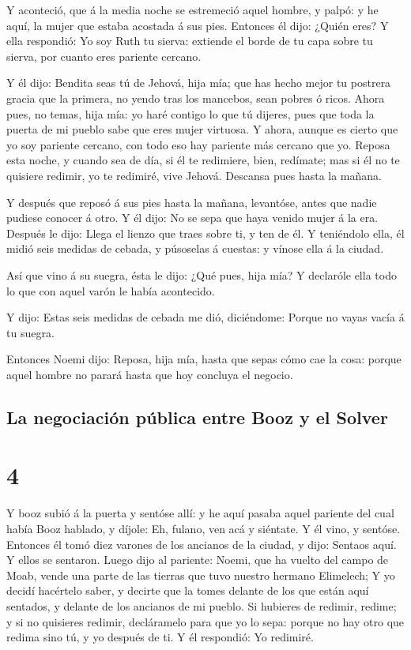  Y aconteció, que á la media noche se estremeció aquel
hombre, y palpó: y he aquí, la mujer que estaba acostada á sus pies.
 Entonces él dijo: ¿Quién eres? Y ella respondió: Yo soy
Ruth tu sierva: extiende el borde de tu capa sobre tu sierva, por cuanto
eres pariente cercano.

 Y él dijo: Bendita seas tú de Jehová, hija mía; que has
hecho mejor tu postrera gracia que la primera, no yendo tras los
mancebos, sean pobres ó ricos.  Ahora pues, no temas, hija
mía: yo haré contigo lo que tú dijeres, pues que toda la puerta de mi
pueblo sabe que eres mujer virtuosa.  Y ahora, aunque es
cierto que yo soy pariente cercano, con todo eso hay pariente más
cercano que yo.  Reposa esta noche, y cuando sea de día, si
él te redimiere, bien, redímate; mas si él no te quisiere redimir, yo te
redimiré, vive Jehová. Descansa pues hasta la mañana.

 Y después que reposó á sus pies hasta la mañana,
levantóse, antes que nadie pudiese conocer á otro. Y él dijo: No se sepa
que haya venido mujer á la era.  Después le dijo: Llega el
lienzo que traes sobre ti, y ten de él. Y teniéndolo ella, él midió seis
medidas de cebada, y púsoselas á cuestas: y vínose ella á la ciudad.

 Así que vino á su suegra, ésta le dijo: ¿Qué pues, hija
mía? Y declaróle ella todo lo que con aquel varón le había acontecido.

 Y dijo: Estas seis medidas de cebada me dió, diciéndome:
Porque no vayas vacía á tu suegra.

 Entonces Noemi dijo: Reposa, hija mía, hasta que sepas
cómo cae la cosa: porque aquel hombre no parará hasta que hoy concluya
el negocio.

\hypertarget{la-negociaciuxf3n-puxfablica-entre-booz-y-el-solver}{%
\subsection{La negociación pública entre Booz y el
Solver}\label{la-negociaciuxf3n-puxfablica-entre-booz-y-el-solver}}

\hypertarget{section-3}{%
\section{4}\label{section-3}}

 Y booz subió á la puerta y sentóse allí: y he aquí pasaba
aquel pariente del cual había Booz hablado, y díjole: Eh, fulano, ven
acá y siéntate. Y él vino, y sentóse.  Entonces él tomó diez
varones de los ancianos de la ciudad, y dijo: Sentaos aquí. Y ellos se
sentaron.  Luego dijo al pariente: Noemi, que ha vuelto del
campo de Moab, vende una parte de las tierras que tuvo nuestro hermano
Elimelech;  Y yo decidí hacértelo saber, y decirte que la
tomes delante de los que están aquí sentados, y delante de los ancianos
de mi pueblo. Si hubieres de redimir, redime; y si no quisieres redimir,
decláramelo para que yo lo sepa: porque no hay otro que redima sino tú,
y yo después de ti. Y él respondió: Yo redimiré.

